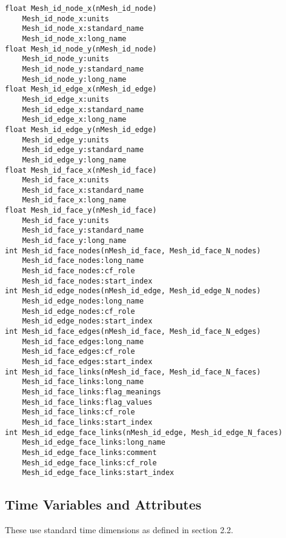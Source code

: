 \begin{verbatim}
float Mesh_id_node_x(nMesh_id_node) 
    Mesh_id_node_x:units
    Mesh_id_node_x:standard_name
    Mesh_id_node_x:long_name
float Mesh_id_node_y(nMesh_id_node)
    Mesh_id_node_y:units
    Mesh_id_node_y:standard_name
    Mesh_id_node_y:long_name
float Mesh_id_edge_x(nMesh_id_edge)
    Mesh_id_edge_x:units
    Mesh_id_edge_x:standard_name
    Mesh_id_edge_x:long_name
float Mesh_id_edge_y(nMesh_id_edge)
    Mesh_id_edge_y:units
    Mesh_id_edge_y:standard_name
    Mesh_id_edge_y:long_name
float Mesh_id_face_x(nMesh_id_face) 
    Mesh_id_face_x:units
    Mesh_id_face_x:standard_name
    Mesh_id_face_x:long_name
float Mesh_id_face_y(nMesh_id_face)
    Mesh_id_face_y:units
    Mesh_id_face_y:standard_name
    Mesh_id_face_y:long_name
int Mesh_id_face_nodes(nMesh_id_face, Mesh_id_face_N_nodes) 
    Mesh_id_face_nodes:long_name
    Mesh_id_face_nodes:cf_role
    Mesh_id_face_nodes:start_index
int Mesh_id_edge_nodes(nMesh_id_edge, Mesh_id_edge_N_nodes)
    Mesh_id_edge_nodes:long_name
    Mesh_id_edge_nodes:cf_role
    Mesh_id_edge_nodes:start_index
int Mesh_id_face_edges(nMesh_id_face, Mesh_id_face_N_edges)
    Mesh_id_face_edges:long_name
    Mesh_id_face_edges:cf_role
    Mesh_id_face_edges:start_index
int Mesh_id_face_links(nMesh_id_face, Mesh_id_face_N_faces)
    Mesh_id_face_links:long_name
    Mesh_id_face_links:flag_meanings
    Mesh_id_face_links:flag_values
    Mesh_id_face_links:cf_role
    Mesh_id_face_links:start_index
int Mesh_id_edge_face_links(nMesh_id_edge, Mesh_id_edge_N_faces) 
    Mesh_id_edge_face_links:long_name
    Mesh_id_edge_face_links:comment
    Mesh_id_edge_face_links:cf_role
    Mesh_id_edge_face_links:start_index
\end{verbatim}

\subsection{Time Variables and Attributes}


These use standard time dimensions as defined in section 2.2.

